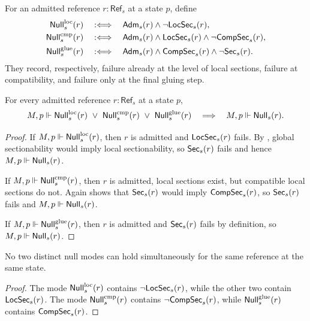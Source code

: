 \begin{definition}\label{def:null-failure-modes}
For an admitted reference $r:\mathsf{Ref}_s$ at a state $p$, define
\begin{align*}
\mathsf{Null}_s^{\mathrm{loc}}(r)
&\quad:\Longleftrightarrow\quad
\mathsf{Adm}_s(r)\land \neg\mathsf{LocSec}_s(r),\\
\mathsf{Null}_s^{\mathrm{cmp}}(r)
&\quad:\Longleftrightarrow\quad
\mathsf{Adm}_s(r)\land \mathsf{LocSec}_s(r)\land \neg\mathsf{CompSec}_s(r),\\
\mathsf{Null}_s^{\mathrm{glue}}(r)
&\quad:\Longleftrightarrow\quad
\mathsf{Adm}_s(r)\land \mathsf{CompSec}_s(r)\land \neg\mathsf{Sec}_s(r).
\end{align*}
They record, respectively, failure already at the level of local sections, failure at compatibility, and failure only at the final gluing step.
\end{definition}

\begin{proposition}\label{prop:null-modes-imply-null}
For every admitted reference $r:\mathsf{Ref}_s$ at a state $p$,
\[
M,p\Vdash \Null_s^{\mathrm{loc}}(r)\ \lor\ \Null_s^{\mathrm{cmp}}(r)\ \lor\ \Null_s^{\mathrm{glue}}(r)
\quad\Longrightarrow\quad
M,p\Vdash \Null_s(r).
\]
\end{proposition}

\begin{proof}
If $M,p\Vdash \mathsf{Null}_s^{\mathrm{loc}}(r)$, then $r$ is admitted and $\mathsf{LocSec}_s(r)$ fails. By , global sectionability would imply local sectionability, so $\mathsf{Sec}_s(r)$ fails and hence $M,p\Vdash \mathsf{Null}_s(r)$.

If $M,p\Vdash \mathsf{Null}_s^{\mathrm{cmp}}(r)$, then $r$ is admitted, local sections exist, but compatible local sections do not. Again  shows that $\mathsf{Sec}_s(r)$ would imply $\mathsf{CompSec}_s(r)$, so $\mathsf{Sec}_s(r)$ fails and $M,p\Vdash \mathsf{Null}_s(r)$.

If $M,p\Vdash \mathsf{Null}_s^{\mathrm{glue}}(r)$, then $r$ is admitted and $\mathsf{Sec}_s(r)$ fails by definition, so $M,p\Vdash \mathsf{Null}_s(r)$.
\end{proof}

\begin{proposition}\label{prop:null-modes-exclusive}
No two distinct null modes can hold simultaneously for the same reference at the same state.
\end{proposition}

\begin{proof}
The mode $\mathsf{Null}^{\mathrm{loc}}_s(r)$ contains $\neg\mathsf{LocSec}_s(r)$, while the other two contain $\mathsf{LocSec}_s(r)$. The mode $\mathsf{Null}^{\mathrm{cmp}}_s(r)$ contains $\neg\mathsf{CompSec}_s(r)$, while $\mathsf{Null}^{\mathrm{glue}}_s(r)$ contains $\mathsf{CompSec}_s(r)$.
\end{proof}


